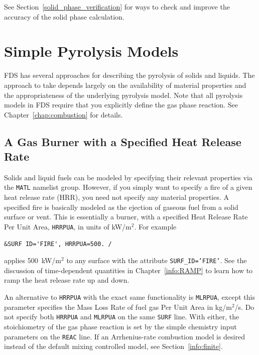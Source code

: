 \documentclass[11pt]{book}
\newcommand{\ct}{\tt\small}
\begin{document}
See Section~\ref{solid_phase_verification} for ways to check and improve the accuracy of the solid phase calculation.


\clearpage

\section{Simple Pyrolysis Models}

FDS has several approaches for describing the pyrolysis of solids and liquids. The approach to take depends largely
on the availability of material properties and the appropriateness of the underlying pyrolysis model.
Note that all pyrolysis models in FDS require that you explicitly define the gas phase reaction. See Chapter~\ref{chap:combustion} for details.

\subsection{A Gas Burner with a Specified Heat Release Rate}

\label{info:gas_burner}

Solids and liquid fuels can be modeled by specifying their relevant
properties via the {\ct MATL} namelist group. However, if you simply
want to specify a fire of a given heat release rate (HRR),
you need not specify any material properties. A specified fire is
basically modeled as the ejection of gaseous fuel
from a solid surface or vent. This is essentially a burner, with a
specified Heat Release Rate Per Unit Area, {\ct HRRPUA}, in units of
kW/m$^2$. For example

\footnotesize
\begin{verbatim}
&SURF ID='FIRE', HRRPUA=500. /
\end{verbatim}
\normalsize

\noindent
applies 500~kW/m$^2$ to any surface with the attribute
{\ct SURF\_ID='FIRE'}. See the discussion of time-dependent quantities
in Chapter~\ref{info:RAMP} to learn how to ramp the heat release rate up and down.

An alternative to {\ct HRRPUA} with the exact same functionality is
{\ct MLRPUA}, except this parameter
specifies the Mass Loss Rate of fuel gas Per Unit Area in kg/m$^2$/s. Do not specify both
{\ct HRRPUA} and {\ct MLRPUA} on the same {\ct SURF} line. With either,
the stoichiometry of the gas phase reaction is set by the simple chemistry input
parameters on the {\ct REAC} line.
If an Arrhenius-rate combustion model is desired instead of the default mixing controlled model, see Section~\ref{info:finite}.
\end{document}

